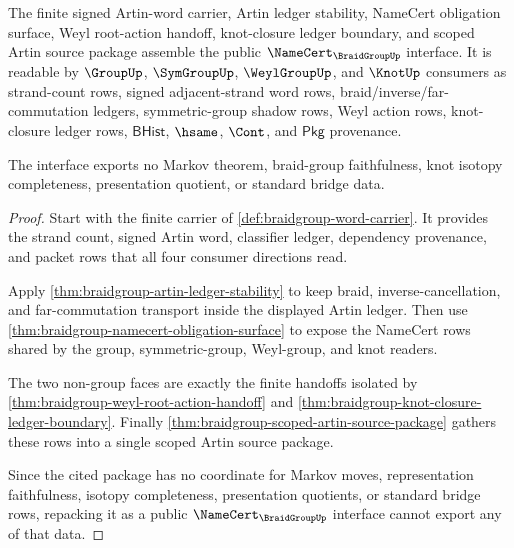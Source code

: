 \begin{theorem}
\label{thm:braidgroup-public-artin-interface}
The finite signed Artin-word carrier, Artin ledger stability, NameCert
obligation surface, Weyl root-action handoff, knot-closure ledger boundary, and
scoped Artin source package assemble the public
$\NameCert_{\BraidGroupUp}$ interface. It is readable by $\GroupUp$,
$\SymGroupUp$, $\WeylGroupUp$, and $\KnotUp$ consumers as strand-count rows,
signed adjacent-strand word rows, braid/inverse/far-commutation ledgers,
symmetric-group shadow rows, Weyl action rows, knot-closure ledger rows,
$\mathsf{BHist}$, $\hsame$, $\Cont$, and $\mathsf{Pkg}$ provenance.

The interface exports no Markov theorem, braid-group faithfulness, knot isotopy
completeness, presentation quotient, or standard bridge data.
\end{theorem}
\begin{proof}
Start with the finite carrier of \autoref{def:braidgroup-word-carrier}. It
provides the strand count, signed Artin word, classifier ledger, dependency
provenance, and packet rows that all four consumer directions read.

Apply \autoref{thm:braidgroup-artin-ledger-stability} to keep braid,
inverse-cancellation, and far-commutation transport inside the displayed Artin
ledger. Then use \autoref{thm:braidgroup-namecert-obligation-surface} to expose
the NameCert rows shared by the group, symmetric-group, Weyl-group, and knot
readers.

The two non-group faces are exactly the finite handoffs isolated by
\autoref{thm:braidgroup-weyl-root-action-handoff} and
\autoref{thm:braidgroup-knot-closure-ledger-boundary}. Finally
\autoref{thm:braidgroup-scoped-artin-source-package} gathers these rows into a
single scoped Artin source package.

Since the cited package has no coordinate for Markov moves, representation
faithfulness, isotopy completeness, presentation quotients, or standard bridge
rows, repacking it as a public $\NameCert_{\BraidGroupUp}$ interface cannot
export any of that data.
\end{proof}


